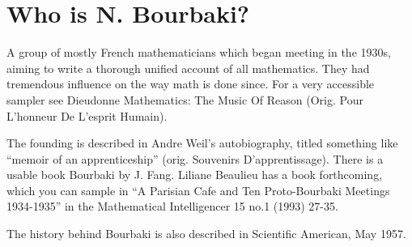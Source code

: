 \section{Who is N. Bourbaki?}

A group of mostly French mathematicians
which began meeting in the 1930s, aiming to write a thorough unified
account of all mathematics. They had tremendous influence on
the way math is done since. For a very accessible sampler see
Dieudonne Mathematics: The Music Of Reason (Orig. Pour L'honneur
De L'esprit Humain).


The founding is described in
Andre Weil's autobiography, titled something like ``memoir of
an apprenticeship'' (orig. Souvenirs D'apprentissage). There is a
usable book Bourbaki by J. Fang. Liliane Beaulieu has a book
forthcoming, which you can sample in ``A Parisian Cafe and
Ten Proto-Bourbaki Meetings 1934-1935'' in the Mathematical
Intelligencer 15 no.1 (1993) 27-35.

The history behind Bourbaki is also described in Scientific American,
May 1957.
